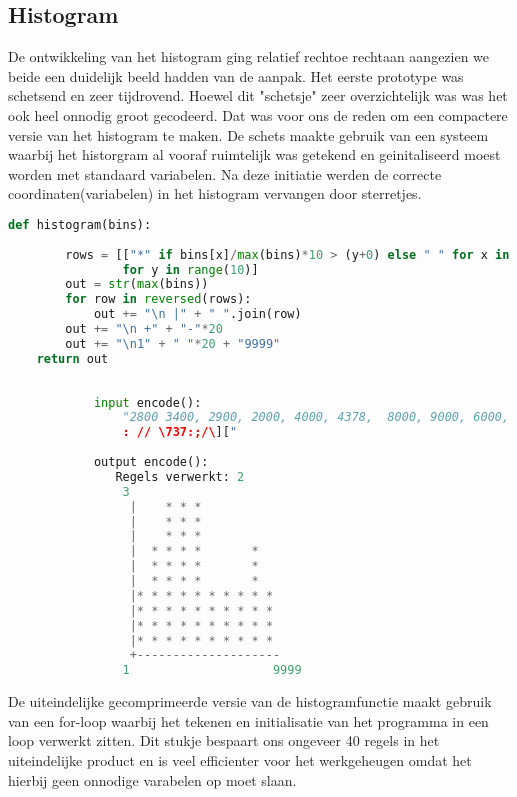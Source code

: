 \documentclass{article}
\begin{document}
    \subsection{Histogram}
      De ontwikkeling van het histogram ging relatief rechtoe rechtaan aangezien we beide een duidelijk beeld hadden van de aanpak. Het eerste prototype was schetsend en zeer tijdrovend. Hoewel dit "schetsje" zeer overzichtelijk was was het ook heel onnodig groot gecodeerd. Dat was voor ons de reden om een compactere versie van het histogram te maken. De schets maakte gebruik van een systeem waarbij het historgram al vooraf ruimtelijk was getekend en geinitaliseerd moest worden met standaard variabelen. Na deze initiatie werden de correcte coordinaten(variabelen) in het histogram vervangen door sterretjes. 
      \begin{lstlisting}[frame=single, language=python] 
    def histogram(bins):
    
        rows = [["*" if bins[x]/max(bins)*10 > (y+0) else " " for x in range(10)]
                for y in range(10)]
        out = str(max(bins))
        for row in reversed(rows):
            out += "\n |" + " ".join(row)
        out += "\n +" + "-"*20
        out += "\n1" + " "*20 + "9999"
    return out
      \end{lstlisting}
      
      \newpage
      \begin{lstlisting}[frame=single, language=python]  % Start your code-block
            
            input encode():
                "2800 3400, 2900, 2000, 4000, 4378,  8000, 9000, 6000, 5689, 3478, 4085, 7095, 1010,1785, 3000,8090
                : // \737:;/\]["
    
            output encode():
               Regels verwerkt: 2
                3
                 |    * * *          
                 |    * * *          
                 |    * * *          
                 |  * * * *       *  
                 |  * * * *       *  
                 |  * * * *       *  
                 |* * * * * * * * * *
                 |* * * * * * * * * *
                 |* * * * * * * * * *
                 |* * * * * * * * * *
                 +--------------------
                1                    9999
        \end{lstlisting}
      
      De uiteindelijke gecomprimeerde versie van de histogramfunctie maakt gebruik van een for-loop waarbij het tekenen en initialisatie van het programma in een loop verwerkt zitten. Dit stukje bespaart ons ongeveer 40 regels in het uiteindelijke product en is veel efficienter voor het werkgeheugen omdat het hierbij geen onnodige varabelen op moet slaan. 
    
\end{document}
